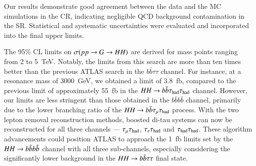     Our results demonstrate good agreement between the data and the MC simulations in the CR, 
    indicating negligible QCD background contamination in the SR. 
    Statistical and systematic uncertainties were evaluated and incorporated into the final upper limits.

    The 95\% CL limits on $\sigma(pp\rightarrow G \rightarrow HH)$ are derived for mass points ranging from 2 to 5~TeV. 
    Notably, the limits from this search are more than ten times better than the previous ATLAS search in the $b\bar{b}\tau\tau$ channel. 
    For instance, at a resonance mass of 3000~GeV, we obtained a limit of 3.8~fb, compared to the previous limit of approximately 55~fb 
    in the $HH\rightarrow b\bar{b}\tau_{\text{had}}\tau_{\text{had}}$ channel. 
    However, our limits are less stringent than those obtained in the $b\bar{b}b\bar{b}$ channel, 
    primarily due to the lower branching ratio of the $HH\rightarrow b\bar{b}\tau_\mathrm{\mu}\tau_{\text{had}}$ process. 
    With the two lepton removal reconstruction methods, boosted di-tau systems can now be reconstructed for all three channels --- $\tau_\mathrm{\mu}\tau_\mathrm{had}$, $\tau_e\tau_\mathrm{had}$ and $\tau_\mathrm{had}\tau_\mathrm{had}$.
    These algorithm advancements could position ATLAS to approach the 1~fb limits set by the $HH\rightarrow b\bar{b}b\bar{b}$ channel with all three sub-channels, 
    especially considering the significantly lower background in the $HH\rightarrow b\bar{b}\tau\tau$ final state.
